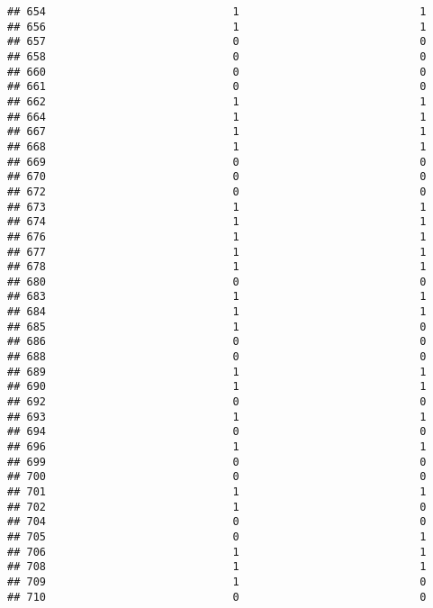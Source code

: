 \documentclass[
]{article}
\begin{document}
\begin{verbatim}
## 654                             1                            1
## 656                             1                            1
## 657                             0                            0
## 658                             0                            0
## 660                             0                            0
## 661                             0                            0
## 662                             1                            1
## 664                             1                            1
## 667                             1                            1
## 668                             1                            1
## 669                             0                            0
## 670                             0                            0
## 672                             0                            0
## 673                             1                            1
## 674                             1                            1
## 676                             1                            1
## 677                             1                            1
## 678                             1                            1
## 680                             0                            0
## 683                             1                            1
## 684                             1                            1
## 685                             1                            0
## 686                             0                            0
## 688                             0                            0
## 689                             1                            1
## 690                             1                            1
## 692                             0                            0
## 693                             1                            1
## 694                             0                            0
## 696                             1                            1
## 699                             0                            0
## 700                             0                            0
## 701                             1                            1
## 702                             1                            0
## 704                             0                            0
## 705                             0                            1
## 706                             1                            1
## 708                             1                            1
## 709                             1                            0
## 710                             0                            0

\end{verbatim}
\end{document}
